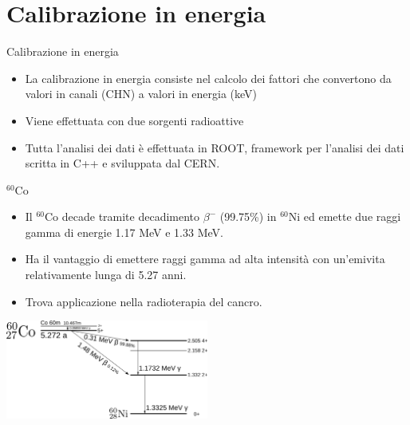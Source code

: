 \documentclass [xcolor=svgnames] {beamer}
\begin{document}
\section{Calibrazione in energia}

\begin{frame}{Calibrazione in energia}
	\begin{itemize}
		\item La calibrazione in energia consiste nel calcolo dei fattori che convertono da valori in canali (CHN) a valori in energia (keV) 
		\item Viene effettuata con due sorgenti radioattive
		\item Tutta l'analisi dei dati è effettuata in ROOT, framework per l'analisi dei dati scritta in C++ e sviluppata dal CERN.
	\end{itemize}
\end{frame}

\begin{frame}{$^{60}$Co}
	
	
	\begin{itemize}
		\item<1-> Il $^{60}$Co decade tramite decadimento $\beta^{-}$ (99.75\%) in $^{60}$Ni ed emette due raggi gamma di energie 1.17 MeV e 1.33 MeV.
		\item<2-> Ha il vantaggio di emettere raggi gamma ad alta intensità con un'emivita relativamente lunga di 5.27 anni. 
		\item<3-> Trova applicazione nella radioterapia del cancro.
	\end{itemize}
	
	\centering
	\includegraphics[width=0.5\textwidth]{img/Cobalt-60m-decay.png}
	
\end{frame}
\end{document}
